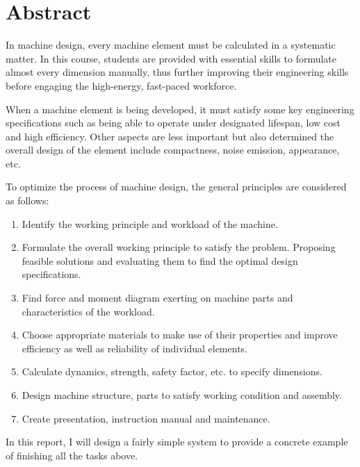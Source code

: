 \chapter*{Abstract}
In machine design, every machine element must be calculated in a systematic matter. In this course, students are provided with essential skills to formulate almost every dimension manually, thus further improving their engineering skills before engaging the high-energy, fast-paced workforce.

When a machine element is being developed, it must satisfy some key engineering specifications such as being able to operate under designated lifespan, low cost and high efficiency. Other aspects are less important but also determined the overall design of the element include compactness, noise emission, appearance, etc.

To optimize the process of machine design, the general principles are considered as follows:
\begin{enumerate}
	\item Identify the working principle and workload of the machine.
	\item Formulate the overall working principle to satisfy the problem. Proposing feasible solutions and evaluating them to find the optimal design specifications.
	\item Find force and moment diagram exerting on machine parts and characteristics of the workload.
	\item Choose appropriate materials to make use of their properties and improve efficiency as well as reliability of individual elements.
	\item Calculate dynamics, strength, safety factor, etc. to specify dimensions.
	\item Design machine structure, parts to satisfy working condition and assembly.
	\item Create presentation, instruction manual and maintenance.
\end{enumerate}
In this report, I will design a fairly simple system to provide a concrete example of finishing all the tasks above.